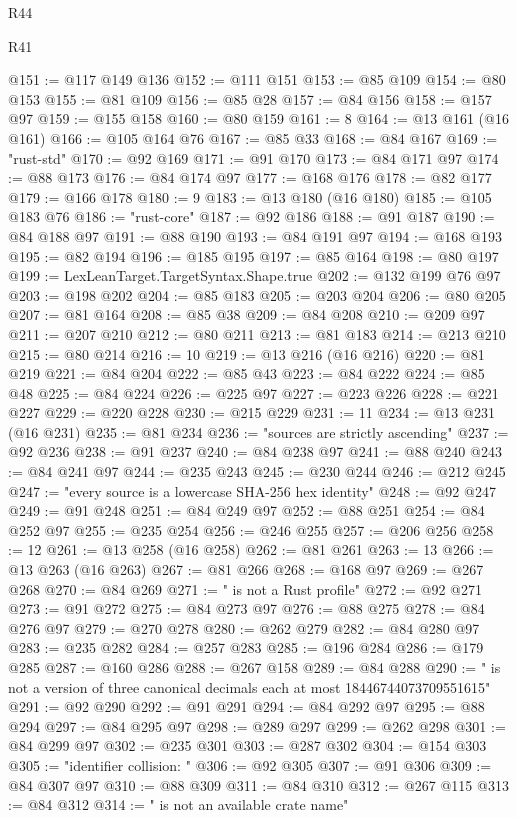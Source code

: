 \begin{lexlean}{R44}
\begin{lexlean}{R41}
\begin{coremodule}
{{{{{{{{{{{{{{{{{{{{{{{{{{{{{{{{{{{{{{{{{{{{{{{{{{{{{{{{{{{{{{{{{{{{{{{{{{{{{{{{{{{{{{{@151 := @117 @149 @136
@152 := @111 @151
@153 := @85 @109
@154 := @80 @153
@155 := @81 @109
@156 := @85 @28
@157 := @84 @156
@158 := @157 @97
@159 := @155 @158
@160 := @80 @159
@161 := 8
@164 := @13 @161 (@16 @161)
@166 := @105 @164 @76
@167 := @85 @33
@168 := @84 @167
@169 := "rust-std"
@170 := @92 @169
@171 := @91 @170
@173 := @84 @171 @97
@174 := @88 @173
@176 := @84 @174 @97
@177 := @168 @176
@178 := @82 @177
@179 := @166 @178
@180 := 9
@183 := @13 @180 (@16 @180)
@185 := @105 @183 @76
@186 := "rust-core"
@187 := @92 @186
@188 := @91 @187
@190 := @84 @188 @97
@191 := @88 @190
@193 := @84 @191 @97
@194 := @168 @193
@195 := @82 @194
@196 := @185 @195
@197 := @85 @164
@198 := @80 @197
@199 := LexLeanTarget.TargetSyntax.Shape.true
@202 := @132 @199 @76 @97
@203 := @198 @202
@204 := @85 @183
@205 := @203 @204
@206 := @80 @205
@207 := @81 @164
@208 := @85 @38
@209 := @84 @208
@210 := @209 @97
@211 := @207 @210
@212 := @80 @211
@213 := @81 @183
@214 := @213 @210
@215 := @80 @214
@216 := 10
@219 := @13 @216 (@16 @216)
@220 := @81 @219
@221 := @84 @204
@222 := @85 @43
@223 := @84 @222
@224 := @85 @48
@225 := @84 @224
@226 := @225 @97
@227 := @223 @226
@228 := @221 @227
@229 := @220 @228
@230 := @215 @229
@231 := 11
@234 := @13 @231 (@16 @231)
@235 := @81 @234
@236 := "sources are strictly ascending"
@237 := @92 @236
@238 := @91 @237
@240 := @84 @238 @97
@241 := @88 @240
@243 := @84 @241 @97
@244 := @235 @243
@245 := @230 @244
@246 := @212 @245
@247 := "every source is a lowercase SHA-256 hex identity"
@248 := @92 @247
@249 := @91 @248
@251 := @84 @249 @97
@252 := @88 @251
@254 := @84 @252 @97
@255 := @235 @254
@256 := @246 @255
@257 := @206 @256
@258 := 12
@261 := @13 @258 (@16 @258)
@262 := @81 @261
@263 := 13
@266 := @13 @263 (@16 @263)
@267 := @81 @266
@268 := @168 @97
@269 := @267 @268
@270 := @84 @269
@271 := " is not a Rust profile"
@272 := @92 @271
@273 := @91 @272
@275 := @84 @273 @97
@276 := @88 @275
@278 := @84 @276 @97
@279 := @270 @278
@280 := @262 @279
@282 := @84 @280 @97
@283 := @235 @282
@284 := @257 @283
@285 := @196 @284
@286 := @179 @285
@287 := @160 @286
@288 := @267 @158
@289 := @84 @288
@290 := " is not a version of three canonical decimals each at most 18446744073709551615"
@291 := @92 @290
@292 := @91 @291
@294 := @84 @292 @97
@295 := @88 @294
@297 := @84 @295 @97
@298 := @289 @297
@299 := @262 @298
@301 := @84 @299 @97
@302 := @235 @301
@303 := @287 @302
@304 := @154 @303
@305 := "identifier collision: "
@306 := @92 @305
@307 := @91 @306
@309 := @84 @307 @97
@310 := @88 @309
@311 := @84 @310
@312 := @267 @115
@313 := @84 @312
@314 := " is not an available crate name"
}}}}}}}}}}}}}}}}}}}}}}}}}}}}}}}}}}}}}}}}}}}}}}}}}}}}}}}}}}}}}}}}}}}}}}}}}}}}}}}}}}}}}}}
\end{coremodule}
\end{lexlean}
\end{lexlean}
